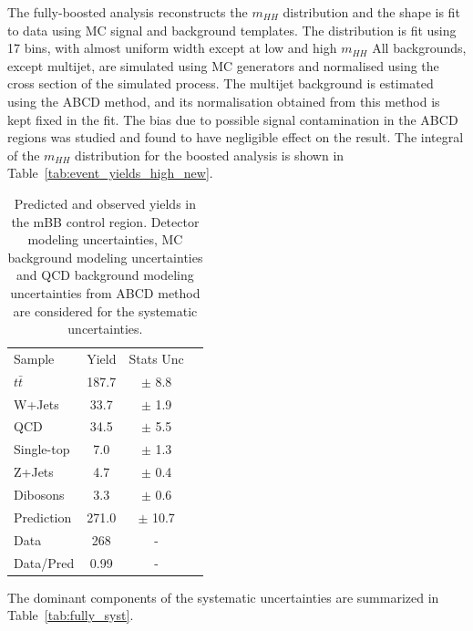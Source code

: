 The fully-boosted analysis reconstructs the ${m_{HH}}$ distribution and the shape is fit to data using MC signal and background templates. The distribution is fit using 17
bins, with almost uniform width except at low and high $m_{HH}$%
All backgrounds, except multijet, are
simulated using MC generators and normalised using the cross section of the
simulated process. The multijet background is estimated using the ABCD
method, and its normalisation obtained from this method is kept fixed in the fit. The bias due
to possible signal contamination in the ABCD regions was studied
and found to have negligible effect on the result.  The integral of the $m_{HH}$
distribution for the boosted analysis is shown in
Table~\ref{tab:event_yields_high_new}.
\renewcommand{\arraystretch}{1.5}
\begin{table}
\begin{center}
\begin{tabular}{l|c|c|c}
Sample        &  Yield   &  Stats Unc \\  
$t\bar{t}$    &  187.7  & $\pm$ 8.8    \\
W+Jets        &  33.7   & $\pm$ 1.9     \\
QCD           &  34.5   & $\pm$ 5.5     \\
Single-top    &  7.0   & $\pm$ 1.3     \\
Z+Jets        &  4.7    & $\pm$ 0.4        \\
Dibosons      &  3.3    & $\pm$ 0.6      \\
\hline
Prediction    &  271.0  & $\pm$ 10.7       \\
Data          &  268    & - \\
\hline
Data/Pred     &  0.99    & -  \\
\hline
\end{tabular}
\end{center}
\caption[Predicted and observed yields in the mBB control region]{Predicted and observed yields in the mBB control region. Detector modeling
uncertainties, MC background modeling uncertainties and QCD background modeling uncertainties
from ABCD method are considered for the systematic uncertainties.}
\label{tab:boosted_bkgd_mbbcr_yields_new}
\end{table}
\renewcommand{\arraystretch}{1.0}
 
The dominant components of the systematic uncertainties are summarized in Table~\ref{tab:fully_syst}.
\newpage

